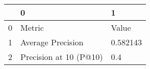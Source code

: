 \begin{tabular}{lll}
\toprule
{} &                       0 &         1 \\
\midrule
0 &                  Metric &     Value \\
1 &       Average Precision &  0.582143 \\
2 &  Precision at 10 (P@10) &       0.4 \\
\bottomrule
\end{tabular}
